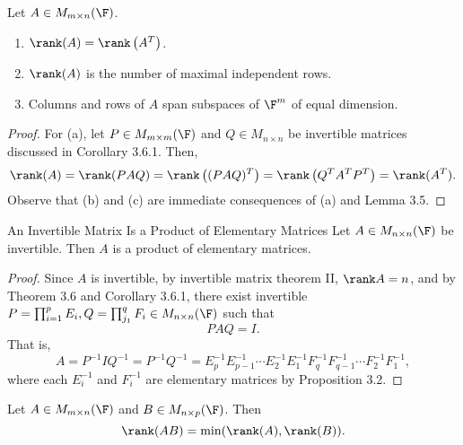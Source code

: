 \documentclass[linearalgebra]{subfiles}
\begin{document}
    \begin{cor}{}
        Let $A\in M_{m\times n}(\F)$. 
        \begin{enumerate}
            \item $\rank(A) = \rank\left( A^{T}  \right) $.
            \item $\rank(A)$ is the number of maximal independent rows.
            \item Columns and rows of $A$ span subspaces of $\F^m$ of equal dimension.
        \end{enumerate}
    \end{cor}	

    \begin{proof}
        For (a), let $P\in M_{m\times m}(\F)$ and $Q\in M_{n\times n}$ be invertible matrices discussed in Corollary 3.6.1. Then,
        \begin{equation*}
            \rank(A) = \rank(PAQ) = \rank \left( (PAQ)^T \right) = \rank \left( Q^TA^TP^T \right) = \rank (A^T). 
        \end{equation*}
        Observe that (b) and (c) are immediate consequences of (a) and Lemma 3.5.
    \end{proof}

    \begin{cor}{An Invertible Matrix Is a Product of Elementary Matrices}
        Let $A\in M_{n\times n}(\F)$ be invertible. Then $A$ is a product of elementary matrices.
    \end{cor}	

    \begin{proof}
        Since $A$ is invertible, by invertible matrix theorem II, $\rank A = n$, and by Theorem 3.6 and Corollary 3.6.1, there exist invertible $P=\prod^p_{i=1}E_i, Q=\prod^q_{j_1}F_i\in M_{n\times n}(\F)$ such that
        \begin{equation*}
            PAQ = I.
        \end{equation*}
        That is,
        \begin{equation*}
            A = P^{-1}IQ^{-1} = P^{-1}Q^{-1} = E_p^{-1}E_{p-1}^{-1}\cdots E_2^{-1}E_1^{-1} F_q^{-1}F_{q-1}^{-1}\cdots F_2^{-1}F_1^{-1},
        \end{equation*}
        where each $E_i^{-1}$ and $F_i^{-1}$ are elementary matrices by Proposition 3.2.
    \end{proof}

    \begin{prop}{}
        Let $A\in M_{m\times n}(\F)$ and $B\in M_{n\times p}(\F)$. Then
        \begin{equation*}
            \rank(AB) = \min(\rank(A), \rank(B)).
        \end{equation*}
    \end{prop}
\end{document}
